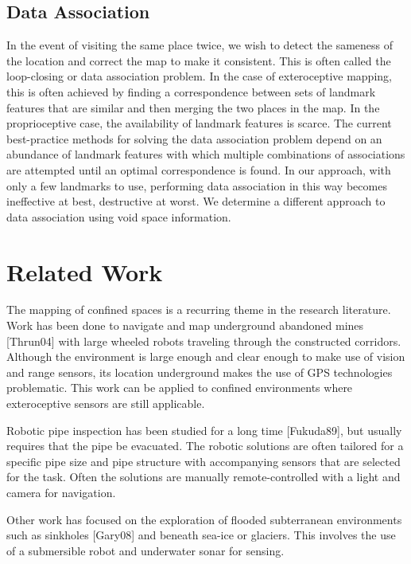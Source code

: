 \subsection{Data Association}
\label{dataassociation}

In the event of visiting the same place twice, we wish to detect the sameness of the location and correct the map to make it consistent. This is often called the loop-closing or data association problem. In the case of exteroceptive mapping, this is often achieved by finding a correspondence between sets of landmark features that are similar and then merging the two places in the map. In the proprioceptive case, the availability of landmark features is scarce. The current best-practice methods for solving the data association problem depend on an abundance of landmark features with which multiple combinations of associations are attempted until an optimal correspondence is found. In our approach, with only a few landmarks to use, performing data association in this way becomes ineffective at best, destructive at worst. We determine a different approach to data association using void space information.

\section{Related Work}
\label{relatedwork}

The mapping of confined spaces is a recurring theme in the research literature. Work has been done to navigate and map underground abandoned mines [Thrun04] with large wheeled robots traveling through the constructed corridors. Although the environment is large enough and clear enough to make use of vision and range sensors, its location underground makes the use of GPS technologies problematic. This work can be applied to confined environments where exteroceptive sensors are still applicable.

Robotic pipe inspection has been studied for a long time [Fukuda89], but usually requires that the pipe be evacuated. The robotic solutions are often tailored for a specific pipe size and pipe structure with accompanying sensors that are selected for the task. Often the solutions are manually remote-controlled with a light and camera for navigation.

Other work has focused on the exploration of flooded subterranean environments such as sinkholes [Gary08] and beneath sea-ice or glaciers. This involves the use of a submersible robot and underwater sonar for sensing.

